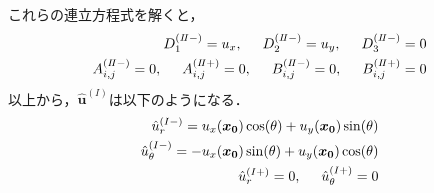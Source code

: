 これらの連立方程式を解くと，
\begin{align}
	D_{1}^{(I\hspace{-.15em}I-)}=u_{x},\hspace{0.5cm}D_{2}^{(I\hspace{-.15em}I-)}=u_{y},\hspace{0.5cm}D_{3}^{(I\hspace{-.15em}I-)}=0
	\nonumber
	\\
	A_{i,j}^{(I\hspace{-.15em}I-)}=0,\hspace{0.5cm}A_{i,j}^{(I\hspace{-.15em}I+)}=0,\hspace{0.5cm}
	B_{i,j}^{(I\hspace{-.15em}I-)}=0,\hspace{0.5cm}B_{i,j}^{(I\hspace{-.15em}I+)}=0
\end{align}
以上から，$\hat{\bm{u}}^{(I)}$は以下のようになる．
\begin{align}
	\hat{u}_{r}^{(I-)}=u_{x}(\bm{x_{0}})\cos(\theta)+u_{y}(\bm{x_{0}})\sin(\theta)
	\nonumber
	\\
	\hat{u}_{\theta}^{(I-)}=-u_{x}(\bm{x_{0}})\sin(\theta)+u_{y}(\bm{x_{0}})\cos(\theta)
	\nonumber
	\\
	\hat{u}_{r}^{(I+)}=0,\hspace{0.5cm}\hat{u}_{\theta}^{(I+)}=0
\end{align}

\newpage
